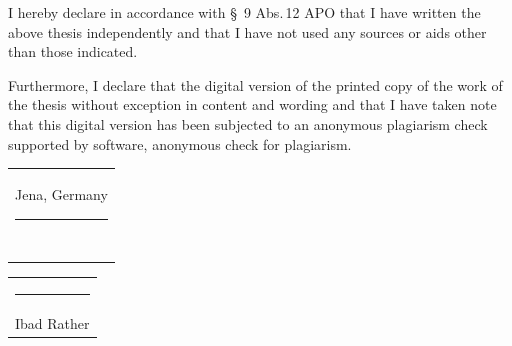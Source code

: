 \documentclass[
thesis%
]{csthes}
\begin{document}
I hereby declare in accordance with \S~9 Abs.\,12 APO that I have written the above {\thesistype}thesis independently and that I have not used any sources or aids other than those indicated. 

Furthermore, I declare that the digital version of the printed copy of the {\thesistype}work 
of the {\thesistype} thesis without exception in content and wording and that I have taken note 
that this digital version has been subjected to an anonymous plagiarism check supported by software, 
anonymous check for plagiarism. 


\bigskip
\bigskip

\begin{tabular}{@{}l@{}}
  Jena, Germany \rule[-0.8em]{7em}{0.5pt}\\[2ex]
  ~
\end{tabular}
\hspace{\fill}%
\begin{tabular}{@{}c@{}}
  \rule[-0.8em]{19em}{0.5pt}\\[2ex]
  {Ibad Rather}
\end{tabular}\hspace{\fill}

\end{document}
